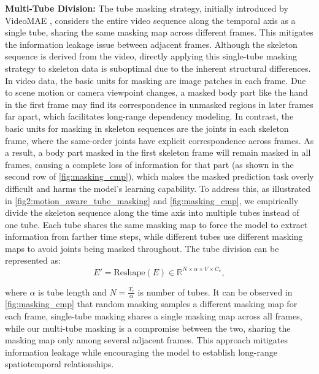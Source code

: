 \noindent \textbf{Multi-Tube Division:}
The tube masking strategy, initially introduced by VideoMAE \cite{tong2022videomae},
considers the entire video sequence along the temporal axis as a single tube,
sharing the same masking map across different frames. This mitigates the information
leakage issue between adjacent frames.
Although the skeleton sequence is derived from the
video, directly applying this single-tube
masking strategy to skeleton data is suboptimal due to the inherent structural differences.
In video data, the basic units for masking are image patches in each frame. Due to scene
motion or camera viewpoint changes, a masked body part like the hand in the first frame
may find its correspondence in unmasked regions in later frames far apart, which facilitates
long-range dependency modeling.
In contrast, the basic units for masking in skeleton sequences
are the joints in each skeleton frame, where the same-order joints have explicit correspondence
across frames. As a result, a body part masked in the first skeleton frame will remain
masked in all frames, causing a complete loss of information
for that part (as shown in the second row of \cref{fig:masking_cmp}), which makes
the masked prediction task overly difficult and harms the model's learning capability.
To address this, as illustrated in \cref{fig2:motion_aware_tube_masking} and \cref{fig:masking_cmp},
we empirically divide the skeleton sequence along the time axis into multiple tubes
instead of one tube. Each tube shares the same masking map to force the model to extract
information from farther time steps, while different tubes use different masking maps
to avoid joints being masked throughout.
The tube division can be represented as:
\begin{equation}
    \label{eq:deviding_tubes}
    E'=\text{Reshape}(E) \in \mathbb{R}^{N \times \alpha \times V \times C_{e}}, 
\end{equation}

\noindent where $\alpha$ is tube length and $N=\frac{T_{e}}{\alpha}$ is number of tubes.
It can be observed in \cref{fig:masking_cmp} that random
masking samples a different masking map for each frame,
single-tube masking shares a single masking map
across all frames, while our multi-tube masking is a compromise between the two,
sharing the masking map only among several adjacent frames.
This approach mitigates information leakage while encouraging the model to
establish long-range spatiotemporal relationships.

